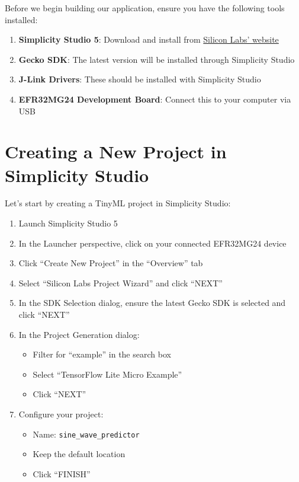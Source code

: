 \documentclass[
  9pt,
  letterpaper,
  abstract,
  titlepage]{scrbook}
\providecommand{\tightlist}{%
  \setlength{\itemsep}{0pt}\setlength{\parskip}{0pt}}\usepackage{longtable,booktabs,array}
\def\tightlist{}
\let\tightlist\relax
\begin{document}
Before we begin building our application, ensure you have the following
tools installed:

\begin{enumerate}
\def\labelenumi{\arabic{enumi}.}
\tightlist
\item
  \textbf{Simplicity Studio 5}: Download and install from
  \href{https://www.silabs.com/developers/simplicity-studio}{Silicon
  Labs' website}
\item
  \textbf{Gecko SDK}: The latest version will be installed through
  Simplicity Studio
\item
  \textbf{J-Link Drivers}: These should be installed with Simplicity
  Studio
\item
  \textbf{EFR32MG24 Development Board}: Connect this to your computer
  via USB
\end{enumerate}

\section{Creating a New Project in Simplicity
Studio}\label{creating-a-new-project-in-simplicity-studio-1}

Let's start by creating a TinyML project in Simplicity Studio:

\begin{enumerate}
\def\labelenumi{\arabic{enumi}.}
\tightlist
\item
  Launch Simplicity Studio 5
\item
  In the Launcher perspective, click on your connected EFR32MG24 device
\item
  Click ``Create New Project'' in the ``Overview'' tab
\item
  Select ``Silicon Labs Project Wizard'' and click ``NEXT''
\item
  In the SDK Selection dialog, ensure the latest Gecko SDK is selected
  and click ``NEXT''
\item
  In the Project Generation dialog:

  \begin{itemize}
  \tightlist
  \item
    Filter for ``example'' in the search box
  \item
    Select ``TensorFlow Lite Micro Example''
  \item
    Click ``NEXT''
  \end{itemize}
\item
  Configure your project:

  \begin{itemize}
  \tightlist
  \item
    Name: \texttt{sine\_wave\_predictor}
  \item
    Keep the default location
  \item
    Click ``FINISH''
  \end{itemize}
\end{enumerate}
\end{document}
